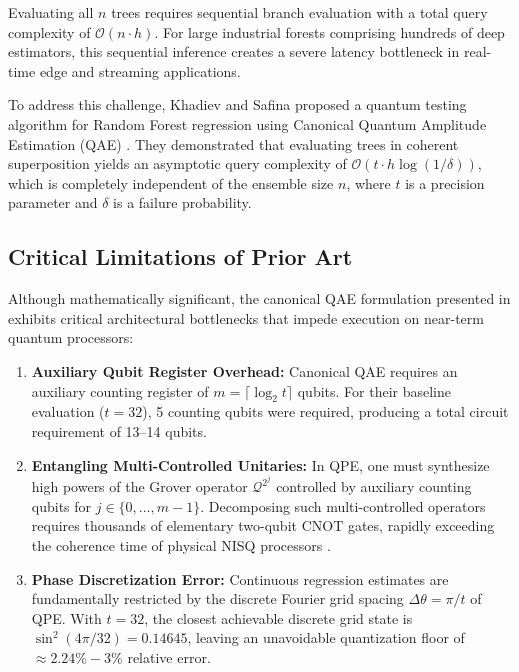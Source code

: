 \documentclass[sn-mathphys,Numbered]{sn-jnl}
\theoremstyle{thmstyleone}
\theoremstyle{thmstyletwo}
\theoremstyle{thmstylethree}
\begin{document}
Evaluating all $n$ trees requires sequential branch evaluation with a total query complexity of $\mathcal{O}(n \cdot h)$. For large industrial forests comprising hundreds of deep estimators, this sequential inference creates a severe latency bottleneck in real-time edge and streaming applications.

To address this challenge, Khadiev and Safina \cite{khadiev2026quantum} proposed a quantum testing algorithm for Random Forest regression using Canonical Quantum Amplitude Estimation (QAE) \cite{brassard2002quantum}. They demonstrated that evaluating trees in coherent superposition yields an asymptotic query complexity of $\mathcal{O}(t \cdot h \log(1/\delta))$, which is completely independent of the ensemble size $n$, where $t$ is a precision parameter and $\delta$ is a failure probability.

\subsection{Critical Limitations of Prior Art}\label{subsec1.1}

Although mathematically significant, the canonical QAE formulation presented in \cite{khadiev2026quantum} exhibits critical architectural bottlenecks that impede execution on near-term quantum processors:
\begin{enumerate}
    \item \textbf{Auxiliary Qubit Register Overhead:} Canonical QAE requires an auxiliary counting register of $m = \lceil \log_2 t \rceil$ qubits. For their baseline evaluation ($t = 32$), 5 counting qubits were required, producing a total circuit requirement of 13--14 qubits.
    \item \textbf{Entangling Multi-Controlled Unitaries:} In QPE, one must synthesize high powers of the Grover operator $\mathcal{Q}^{2^j}$ \cite{grover1996fast} controlled by auxiliary counting qubits for $j \in \{0, \dots, m-1\}$. Decomposing such multi-controlled operators requires thousands of elementary two-qubit CNOT gates, rapidly exceeding the coherence time of physical NISQ processors \cite{preskill2018quantum}.
    \item \textbf{Phase Discretization Error:} Continuous regression estimates are fundamentally restricted by the discrete Fourier grid spacing $\Delta \theta = \pi/t$ of QPE. With $t = 32$, the closest achievable discrete grid state is $\sin^2(4\pi/32) = 0.14645$, leaving an unavoidable quantization floor of $\approx 2.24\% - 3\%$ relative error.
\end{enumerate}
\end{document}
